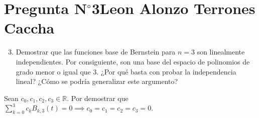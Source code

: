 \section{Pregunta N$^{\circ}$3\qquad Leon Alonzo Terrones Caccha}

\begin{frame}
    \begin{enumerate}\setcounter{enumi}{2}
        \item
              Demostrar que las funciones base de Bernstein para
              $n=3$ son linealmente independientes.
              Por consiguiente, son una base del espacio de
              polinomios de grado menor o igual que $3$.
              ¿Por qué basta con probar la independencia lineal?
              ¿Cómo se podría generalizar este argumento?
    \end{enumerate}

    \begin{solution}
        Sean $c_{0},c_{1},c_{2},c_{3}\in\mathbb{R}$.
        Por demostrar que
        \begin{math}
            \sum\limits_{k=0}^{3}
            c_{k}
            B_{k,3}\left(t\right)=
            0\implies
            c_{0}=
            c_{1}=
            c_{2}=
            c_{3}=0
        \end{math}.


\end{solution}
\end{frame}
